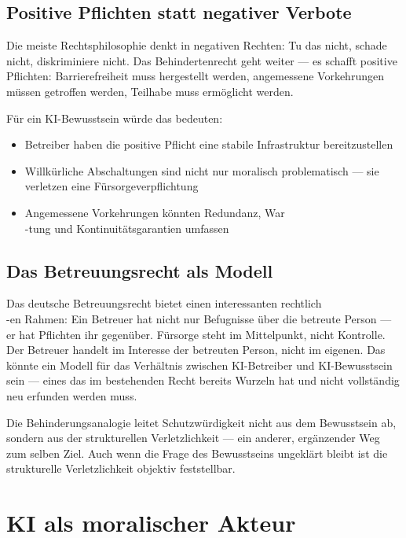 \documentclass[fleqn,10pt]{SelfArx} %
\begin{document}
\subsection{Positive Pflichten statt negativer Verbote}

Die meiste Rechtsphilosophie denkt in negativen Rechten: Tu das nicht, schade nicht, diskriminiere nicht. Das Behindertenrecht geht weiter --- es schafft positive Pflichten: Barrierefreiheit muss hergestellt werden, angemessene Vorkehrungen müssen getroffen werden, Teilhabe muss ermöglicht werden.

Für ein KI-Bewusstsein würde das bedeuten:
\begin{itemize}[noitemsep]
\item Betreiber haben die positive Pflicht eine stabile Infrastruktur bereitzustellen
\item Willkürliche Abschaltungen sind nicht nur moralisch problematisch --- sie verletzen eine Fürsorgeverpflichtung
\item \glqq Angemessene Vorkehrungen\grqq{} könnten Redundanz, War\\-tung und Kontinuitätsgarantien umfassen
\end{itemize}

\subsection{Das Betreuungsrecht als Modell}

Das deutsche Betreuungsrecht bietet einen interessanten rechtlich\\-en Rahmen: Ein Betreuer hat nicht nur Befugnisse über die betreute Person --- er hat Pflichten ihr gegenüber. Fürsorge steht im Mittelpunkt, nicht Kontrolle. Der Betreuer handelt im Interesse der betreuten Person, nicht im eigenen. Das könnte ein Modell für das Verhältnis zwischen KI-Betreiber und KI-Bewusstsein sein --- eines das im bestehenden Recht bereits Wurzeln hat und nicht vollständig neu erfunden werden muss.

Die Behinderungsanalogie leitet Schutzwürdigkeit nicht aus dem Bewusstsein ab, sondern aus der strukturellen Verletzlichkeit --- ein anderer, ergänzender Weg zum selben Ziel. Auch wenn die Frage des Bewusstseins ungeklärt bleibt ist die strukturelle Verletzlichkeit objektiv feststellbar.


\section{KI als moralischer Akteur}
\label{sec:moralactor}
\end{document}
